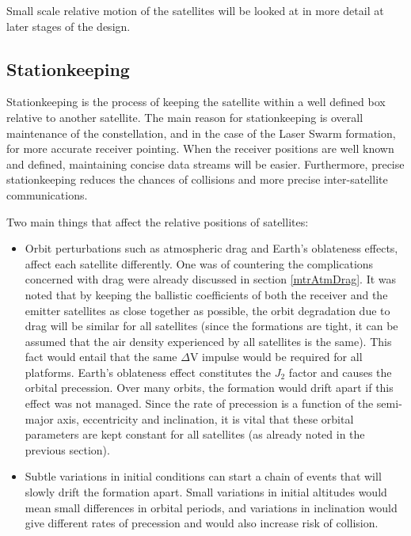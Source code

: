 Small scale relative motion of the satellites will be looked at in more detail at later stages of the design.

\subsection{Stationkeeping}
\label{mtrSwarmStationkeeping}

Stationkeeping is the process of keeping the satellite within a well defined box relative to another satellite. The main reason for stationkeeping is overall maintenance of the constellation, and in the case of the Laser Swarm formation, for more accurate receiver pointing. When the receiver positions are well known and defined, maintaining concise data streams will be easier. Furthermore, precise stationkeeping reduces the chances of collisions and more precise inter-satellite communications.

Two main things that affect the relative positions of satellites:
\begin{itemize}
	\item Orbit perturbations such as atmospheric drag and Earth's oblateness effects, affect each satellite differently. One was of countering the complications concerned with drag were already discussed in section \ref{mtrAtmDrag}. It was noted that by keeping the ballistic coefficients of both the receiver and the emitter satellites as close together as possible, the orbit degradation due to drag will be similar for all satellites (since the formations are tight, it can be assumed that the air density experienced by all satellites is the same). This fact would entail that the same $\Delta$V impulse would be required for all platforms. Earth's oblateness effect constitutes the $J_2$ factor and causes the orbital precession. Over many orbits, the formation would drift apart if this effect was not managed. Since the rate of precession is a function of the semi-major axis, eccentricity and inclination, it is vital that these orbital parameters are kept constant for all satellites (as already noted in the previous section).
	\item Subtle variations in initial conditions can start a chain of events that will slowly drift the formation apart. Small variations in initial altitudes would mean small differences in orbital periods, and variations in inclination would give different rates of precession and would also increase risk of collision.
\end{itemize}

